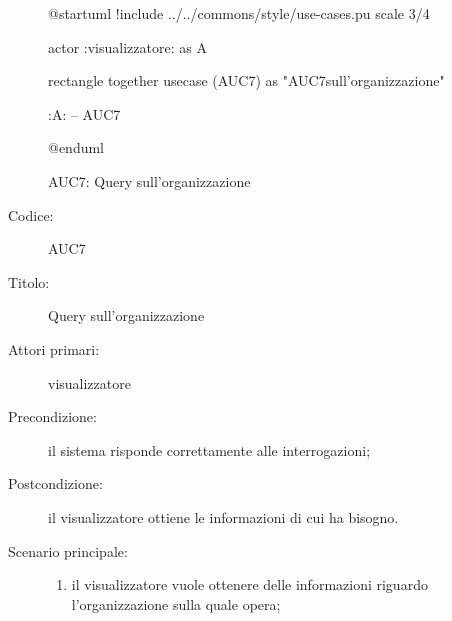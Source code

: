 \documentclass[../../../analisi-dei-requisiti.tex]{subfiles}
\begin{document}
\begin{figure}[h!]
  \centering
  \begin{plantuml}
  @startuml
  !include ../../commons/style/use-cases.pu
  scale 3/4

  actor :visualizzatore: as A

  rectangle {
    together {
      usecase (AUC7) as "AUC7\nQuery sull'organizzazione"
    }
  }

  :A: -- AUC7

  @enduml
  \end{plantuml}
  \caption{AUC7: Query sull'organizzazione}
  \label{fig:AUC7}
\end{figure}

\begin{description}
  \item[Codice:] AUC7
  \item[Titolo:] Query sull'organizzazione
  \item[Attori primari:] visualizzatore
  \item[Precondizione:] il sistema risponde correttamente alle interrogazioni;
  \item[Postcondizione:] il visualizzatore ottiene le informazioni di cui ha bisogno.
  \item[Scenario principale:]
  \begin{enumerate}
    \item il visualizzatore vuole ottenere delle informazioni riguardo l'organizzazione sulla quale opera;
  \end{enumerate}
\end{description}
\end{document}
